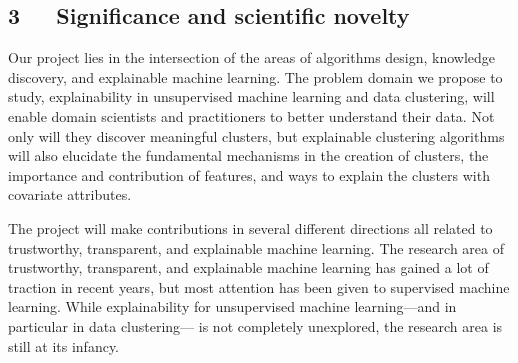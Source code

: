 \documentclass[a4paper,11pt]{article}
\begin{document}



\subsection*{3~~~Significance and scientific novelty}


 Our project lies in the intersection of the areas of  
algorithms design, knowledge discovery, and explainable machine learning.
The problem domain we propose to study, 
explainability in unsupervised machine learning and data clustering, 
will enable domain scientists and practitioners to better understand their data.
Not only will they discover meaningful clusters, 
but explainable clustering algorithms will also elucidate the fundamental mechanisms in the creation of clusters, 
the importance and contribution of features, and ways to explain the clusters
with covariate attributes.

The project will make contributions in several different directions
all related to trustworthy, transparent, and explainable machine learning.
The research area of trustworthy, transparent, and explainable machine learning 
has gained a lot of traction in recent years, but most attention
has been given to supervised machine learning.
While explainability for unsupervised machine learning---and in particular in data clustering---%
is not completely unexplored, 
the research area is still at its infancy.
\end{document}
